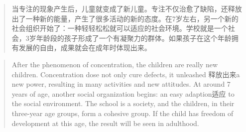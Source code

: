 \documentclass[lang=cn,10pt]{elegantbook}
\begin{document}
\begin{quote}
  {\small 当专注的现象产生后，儿童就变成了新儿童。专注不仅治愈了缺陷，还释放出了一种新的能量，产生了很多活动的新的态度。在7岁左右，另一个新的社会组织开始了：一种轻轻松松就可以适应的社会环境。学校就是一个社会，3岁年龄段的孩子形成了一个有凝聚力的群体。如果孩子在这个年龄拥有发展的自由，成果就会在成年时体现出来。}
\end{quote}

\begin{tcolorbox}
  \begin{quote}
    {\small After the phenomenon of concentration, the children are really new children. Concentration dose not only cure defects, it unleashed 释放出来a new power, resulting in many activities and new attitudes. At around 7 years of age, another social organization begins: an easy adaption适应 to the social environment. The school is a society, and the children, in their three-year age groups, form a cohesive group. If the child has freedom of development at this age, the result will be seen in adulthood.}
  \end{quote}
\end{tcolorbox}
\end{document}
